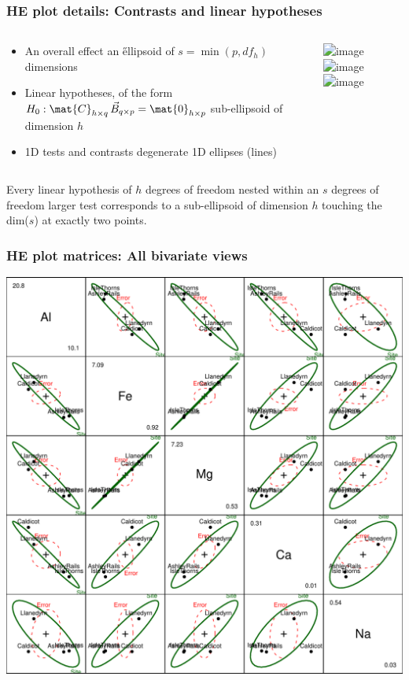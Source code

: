 \begin{frame}
	\frametitle{HE plot details: Contrasts and linear hypotheses}
  \begin{columns}[T]
    \begin{column}{.6\textwidth}
	  \begin{itemize}
	    \item<1-> An overall effect \implies an \H ellipsoid of
		$s = \min( p, df_h)$ dimensions
		\item<2-> Linear hypotheses, of the form 
		$H_0 : \mat{C}_{h \times q} \, \vec{B}_{q \times p} = \mat{0}_{h \times p}$
		\implies sub-ellipsoid of dimension $h$
		\item<3-> 1D tests and contrasts \implies degenerate 1D ellipses (lines)
	  \end{itemize}
    \end{column}
    \begin{column}{.4\textwidth}
    \includegraphics<1>[width=\textwidth,clip]{fig/pottery1-1}
    \includegraphics<2>[width=\textwidth,clip]{fig/pottery1-2}
    \includegraphics<3>[width=\textwidth,clip]{fig/pottery1-3}
    \end{column}
  \end{columns}

 Every linear hypothesis of $h$ degrees of freedom nested within an $s$ degrees of freedom
 larger test corresponds to a sub-ellipsoid of dimension $h$ touching the dim($s$) at
 exactly two points.
\end{frame}

\begin{frame}
	\frametitle{HE plot matrices: All bivariate views}
	\begin{center}
      \includegraphics[height=.8\textheight,clip]{fig/pottery3-1}
	  \\
	\end{center}
\end{frame}
